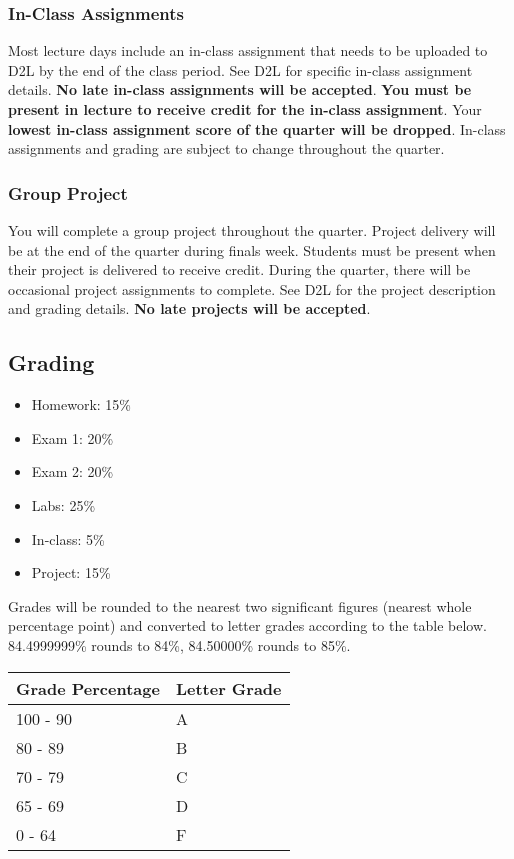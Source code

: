 \documentclass[11pt]{article}
\providecommand{\tightlist}{%
      \setlength{\itemsep}{0pt}\setlength{\parskip}{0pt}}
\begin{document}
    \hypertarget{in-class-assignments}{%
\subsubsection{In-Class Assignments}\label{in-class-assignments}}

Most lecture days include an in-class assignment that needs to be
uploaded to D2L by the end of the class period. See D2L for specific
in-class assignment details. \textbf{No late in-class assignments will
be accepted}. \textbf{You must be present in lecture to receive credit
for the in-class assignment}. Your \textbf{lowest in-class assignment
score of the quarter will be dropped}. In-class assignments and grading
are subject to change throughout the quarter.

    \hypertarget{group-project}{%
\subsubsection{Group Project}\label{group-project}}

You will complete a group project throughout the quarter. Project
delivery will be at the end of the quarter during finals week. Students
must be present when their project is delivered to receive credit.
During the quarter, there will be occasional project assignments to
complete. See D2L for the project description and grading details.
\textbf{No late projects will be accepted}.

    \hypertarget{grading}{%
\subsection{Grading}\label{grading}}

\begin{itemize}
\tightlist
\item
  Homework: 15\%
\item
  Exam 1: 20\%
\item
  Exam 2: 20\%
\item
  Labs: 25\%
\item
  In-class: 5\%
\item
  Project: 15\%
\end{itemize}

Grades will be rounded to the nearest two significant figures (nearest
whole percentage point) and converted to letter grades according to the
table below. 84.4999999\% rounds to 84\%, 84.50000\% rounds to 85\%.

\begin{longtable}[]{@{}ll@{}}
\toprule
Grade Percentage & Letter Grade\tabularnewline
\midrule
\endhead
100 - 90 & A\tabularnewline
80 - 89 & B\tabularnewline
70 - 79 & C\tabularnewline
65 - 69 & D\tabularnewline
0 - 64 & F\tabularnewline
\bottomrule
\end{longtable}
\end{document}
